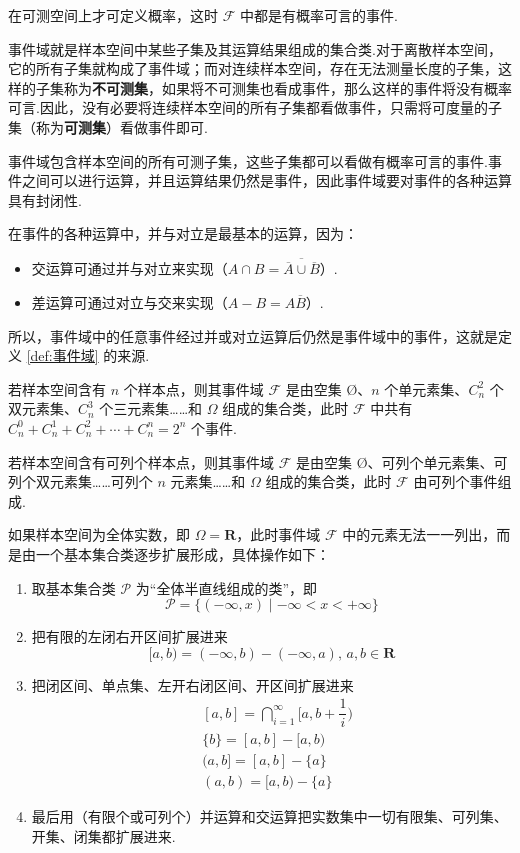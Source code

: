 在可测空间上才可定义概率，这时 $\mathcal{F}$ 中都是有概率可言的事件.

\begin{note}
    \indent 事件域就是样本空间中某些子集及其运算结果组成的集合类.对于离散样本空间，它的所有子集就构成了事件域；而对连续样本空间，存在无法测量长度的子集，这样的子集称为\textbf{不可测集}，如果将不可测集也看成事件，那么这样的事件将没有概率可言.因此，没有必要将连续样本空间的所有子集都看做事件，只需将可度量的子集（称为\textbf{可测集}）看做事件即可.

    \indent 事件域包含样本空间的所有可测子集，这些子集都可以看做有概率可言的事件.事件之间可以进行运算，并且运算结果仍然是事件，因此事件域要对事件的各种运算具有封闭性.

    \indent 在事件的各种运算中，并与对立是最基本的运算，因为：
    \begin{itemize}
        \item 交运算可通过并与对立来实现（$A \cap B = \overline{\overline{A} \cup \overline{B}}$）.
        \item 差运算可通过对立与交来实现（$A-B = A \overline{B}$）.
    \end{itemize}
    所以，事件域中的任意事件经过并或对立运算后仍然是事件域中的事件，这就是定义 \ref{def:事件域} 的来源.
\end{note}

若样本空间含有 $n$ 个样本点，则其事件域 $\mathcal{F}$ 是由空集 $\text{\O}$、$n$ 个单元素集、$C_n^2$ 个双元素集、$C_n^3$ 个三元素集……和 $\varOmega$ 组成的集合类，此时 $\mathcal{F}$ 中共有 $C_n^0 + C_n^1 + C_n^2 + \cdots + C_n^n = 2^n$ 个事件.

若样本空间含有可列个样本点，则其事件域 $\mathcal{F}$ 是由空集 $\text{\O}$、可列个单元素集、可列个双元素集……可列个 $n$ 元素集……和 $\varOmega$ 组成的集合类，此时 $\mathcal{F}$ 由可列个事件组成.

如果样本空间为全体实数，即 $\varOmega = \mathbf{R}$，此时事件域 $\mathcal{F}$ 中的元素无法一一列出，而是由一个基本集合类逐步扩展形成，具体操作如下：
\begin{enumerate}
    \item 取基本集合类 $\mathcal{P}$ 为“全体半直线组成的类”，即
    $$
    \mathcal{P} = \{ (-\infty, x) \mid -\infty < x < +\infty \}
    $$
    \item 把有限的左闭右开区间扩展进来
    $$
    [a,b) = (-\infty,b) - (-\infty,a), \, a,b \in \mathbf{R}
    $$
    \item 把闭区间、单点集、左开右闭区间、开区间扩展进来
    $$
    \begin{aligned}
        & [a,b] = \bigcap_{i=1}^{\infty} \Big[ a, b + \dfrac{1}{i} \Big) \\
        & \{ b \} = [a,b] - [a,b) \\
        & (a,b] = [a,b] - \{ a \} \\
        & (a,b) = [a,b) - \{ a \}
    \end{aligned}
    $$
    \item 最后用（有限个或可列个）并运算和交运算把实数集中一切有限集、可列集、开集、闭集都扩展进来.
\end{enumerate}

